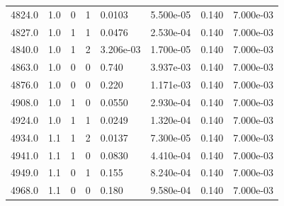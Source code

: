 \documentclass[preview]{standalone}
\begin{document}
{{{{{{{{{\begin{tabular}{L{1.2cm}C{1.2cm} C{0.3cm}C{0.5cm} C{1.4cm}C{1.4cm} C{1.4cm}C{1.4cm}}
  4824.0  &   1.0  & 0     &  1 &  0.0103  & 5.500e-05  & 0.140 &  7.000e-03   \\ 
  4827.0  &   1.0  & 1     &  1 &  0.0476  & 2.530e-04  & 0.140 &  7.000e-03   \\ 
  4840.0  &   1.0  & 1     &  2 &  3.206e-03  & 1.700e-05  & 0.140 &  7.000e-03   \\ 
  4863.0  &   1.0  & 0     &  0 &  0.740  & 3.937e-03  & 0.140 &  7.000e-03   \\ 
  4876.0  &   1.0  & 0     &  0 &  0.220  & 1.171e-03  & 0.140 &  7.000e-03   \\ 
  4908.0  &   1.0  & 1     &  0 &  0.0550  & 2.930e-04  & 0.140 &  7.000e-03   \\ 
  4924.0  &   1.0  & 1     &  1 &  0.0249  & 1.320e-04  & 0.140 &  7.000e-03   \\ 
  4934.0  &   1.1  & 1     &  2 &  0.0137  & 7.300e-05  & 0.140 &  7.000e-03   \\ 
  4941.0  &   1.1  & 1     &  0 &  0.0830  & 4.410e-04  & 0.140 &  7.000e-03   \\ 
  4949.0  &   1.1  & 0     &  1 &  0.155  & 8.240e-04  & 0.140 &  7.000e-03   \\ 
  4968.0  &   1.1  & 0     &  0 &  0.180  & 9.580e-04  & 0.140 &  7.000e-03   \\ 
\hline 
\end{tabular} 

}}}}}}}}}
\end{document}
